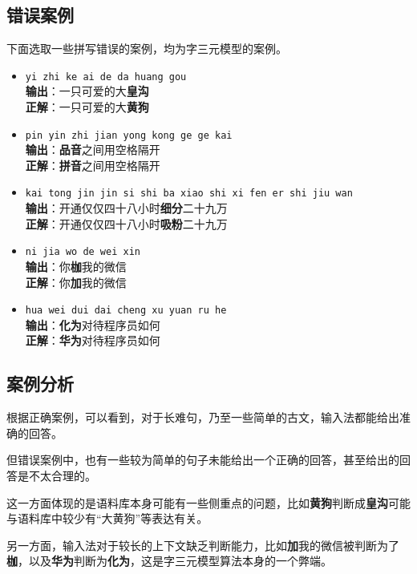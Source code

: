\documentclass[a4paper]{article}
\begin{document}
    \subsection{错误案例}

    下面选取一些拼写错误的案例，均为字三元模型的案例。

    \begin{itemize}
        \item \texttt{yi zhi ke ai de da huang gou} \\
        \textbf{输出}：一只可爱的大\textbf{皇沟} \\
        \textbf{正解}：一只可爱的大\textbf{黄狗}
        \item \texttt{pin yin zhi jian yong kong ge ge kai} \\
        \textbf{输出}：\textbf{品音}之间用空格隔开 \\
        \textbf{正解}：\textbf{拼音}之间用空格隔开
        \item \texttt{kai tong jin jin si shi ba xiao shi xi fen er shi jiu wan} \\
        \textbf{输出}：开通仅仅四十八小时\textbf{细分}二十九万 \\
        \textbf{正解}：开通仅仅四十八小时\textbf{吸粉}二十九万
        \item \texttt{ni jia wo de wei xin} \\
        \textbf{输出}：你\textbf{枷}我的微信 \\
        \textbf{正解}：你\textbf{加}我的微信
        \item \texttt{hua wei dui dai cheng xu yuan ru he} \\
        \textbf{输出}：\textbf{化为}对待程序员如何 \\
        \textbf{正解}：\textbf{华为}对待程序员如何
    \end{itemize}

    \subsection{案例分析}

    根据正确案例，可以看到，对于长难句，乃至一些简单的古文，输入法都能给出准确的回答。

    但错误案例中，也有一些较为简单的句子未能给出一个正确的回答，甚至给出的回答是不太合理的。
    
    这一方面体现的是语料库本身可能有一些侧重点的问题，比如\textbf{黄狗}判断成\textbf{皇沟}可能与语料库中较少有“大黄狗”等表达有关。
    
    另一方面，输入法对于较长的上下文缺乏判断能力，比如\textbf{加}我的微信被判断为了\textbf{枷}，以及\textbf{华为}判断为\textbf{化为}，这是字三元模型算法本身的一个弊端。
\end{document}
